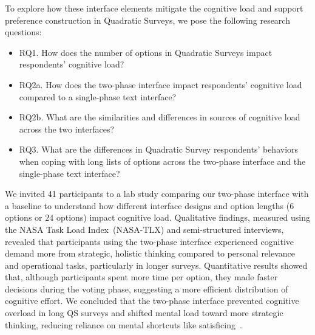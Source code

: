 To explore how these interface elements mitigate the cognitive load and support preference construction in Quadratic Surveys, we pose the following research questions:
\begin{itemize}
    \item RQ1. How does the number of options in Quadratic Surveys impact respondents' cognitive load?
    \item RQ2a. How does the two-phase interface impact respondents' cognitive load compared to a single-phase text interface?
    \item RQ2b. What are the similarities and differences in sources of cognitive load across the two interfaces?
    \item RQ3. What are the differences in Quadratic Survey respondents' behaviors when coping with long lists of options across the two-phase interface and the single-phase text interface?
\end{itemize}

We invited 41 participants to a lab study comparing our two-phase interface with a baseline to understand how different interface designs and option lengths ($6$ options or $24$ options) impact cognitive load. Qualitative findings, measured using the NASA Task Load Index~(NASA-TLX) and semi-structured interviews, revealed that participants using the two-phase interface experienced cognitive demand more from strategic, holistic thinking compared to personal relevance and operational tasks, particularly in longer surveys. Quantitative results showed that, although participants spent more time per option, they made faster decisions during the voting phase, suggesting a more efficient distribution of cognitive effort. We concluded that the two-phase interface prevented cognitive overload in long QS surveys and shifted mental load toward more strategic thinking, reducing reliance on mental shortcuts like satisficing~\cite{simonBehavioralModelRational1955}.


